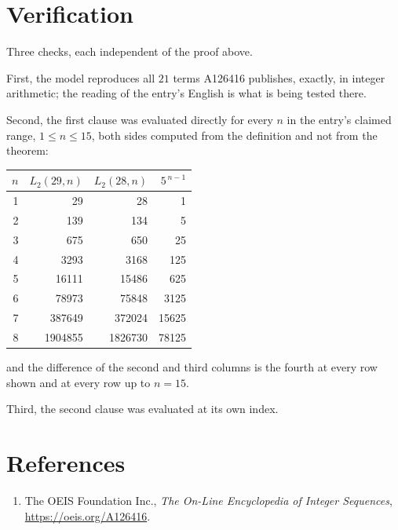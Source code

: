 \documentclass[11pt,a4paper]{article}
\theoremstyle{plain}
\theoremstyle{definition}
\begin{document}
\section{Verification}

Three checks, each independent of the proof above.

First, the model reproduces all $21$ terms A126416 publishes, exactly, in integer
arithmetic; the reading of the entry's English is what is being tested there.

Second, the first clause was evaluated directly for every $n$ in the entry's claimed range,
$1\le n\le15$, both sides computed from the definition and not from the theorem:

\begin{center}
\begin{tabular}{rrrr}
$n$ & $L_{2}(29,n)$ & $L_{2}(28,n)$ & $5^{\,n-1}$ \\ \hline
1 & 29 & 28 & 1 \\
2 & 139 & 134 & 5 \\
3 & 675 & 650 & 25 \\
4 & 3293 & 3168 & 125 \\
5 & 16111 & 15486 & 625 \\
6 & 78973 & 75848 & 3125 \\
7 & 387649 & 372024 & 15625 \\
8 & 1904855 & 1826730 & 78125 \\
\end{tabular}
\end{center}

\noindent and the difference of the second and third columns is the fourth at every row shown
and at every row up to $n=15$.

Third, the second clause was evaluated at its own index.

\section*{References}
\begin{enumerate}
\item The OEIS Foundation Inc., \emph{The On-Line Encyclopedia of Integer Sequences},
\url{https://oeis.org/A126416}.
\end{enumerate}
\end{document}
